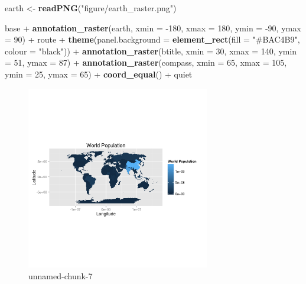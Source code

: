 \documentclass[]{article}
\newenvironment{Shaded}{}{}
\newcommand{\KeywordTok}[1]{\textcolor[rgb]{0.00,0.44,0.13}{\textbf{{#1}}}}
\newcommand{\DataTypeTok}[1]{\textcolor[rgb]{0.56,0.13,0.00}{{#1}}}
\newcommand{\DecValTok}[1]{\textcolor[rgb]{0.25,0.63,0.44}{{#1}}}
\newcommand{\StringTok}[1]{\textcolor[rgb]{0.25,0.44,0.63}{{#1}}}
\newcommand{\NormalTok}[1]{{#1}}
\let\Oldincludegraphics\includegraphics
\renewcommand{\includegraphics}[1]{\Oldincludegraphics[width=8cm]{#1}}
\begin{document}
\begin{Shaded}
\begin{Highlighting}[]
\NormalTok{earth <- }\KeywordTok{readPNG}\NormalTok{(}\StringTok{"figure/earth_raster.png"}\NormalTok{)}

\NormalTok{base + }\KeywordTok{annotation_raster}\NormalTok{(earth, }\DataTypeTok{xmin =} \NormalTok{-}\DecValTok{180}\NormalTok{, }\DataTypeTok{xmax =} \DecValTok{180}\NormalTok{, }\DataTypeTok{ymin =} \NormalTok{-}\DecValTok{90}\NormalTok{, }\DataTypeTok{ymax =} \DecValTok{90}\NormalTok{) + }
    \NormalTok{route + }\KeywordTok{theme}\NormalTok{(}\DataTypeTok{panel.background =} \KeywordTok{element_rect}\NormalTok{(}\DataTypeTok{fill =} \StringTok{"#BAC4B9"}\NormalTok{, }\DataTypeTok{colour =} \StringTok{"black"}\NormalTok{)) + }
    \KeywordTok{annotation_raster}\NormalTok{(btitle, }\DataTypeTok{xmin =} \DecValTok{30}\NormalTok{, }\DataTypeTok{xmax =} \DecValTok{140}\NormalTok{, }\DataTypeTok{ymin =} \DecValTok{51}\NormalTok{, }\DataTypeTok{ymax =} \DecValTok{87}\NormalTok{) + }
    \KeywordTok{annotation_raster}\NormalTok{(compass, }\DataTypeTok{xmin =} \DecValTok{65}\NormalTok{, }\DataTypeTok{xmax =} \DecValTok{105}\NormalTok{, }\DataTypeTok{ymin =} \DecValTok{25}\NormalTok{, }\DataTypeTok{ymax =} \DecValTok{65}\NormalTok{) + }
    \KeywordTok{coord_equal}\NormalTok{() + quiet}
\end{Highlighting}
\end{Shaded}
\begin{figure}[htbp]
\centering
\includegraphics{figure/unnamed-chunk-7.png}
\caption{unnamed-chunk-7}
\end{figure}
\end{document}
